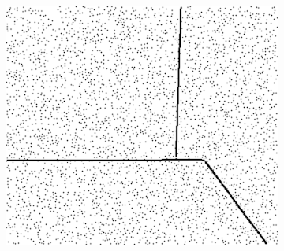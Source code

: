 \documentclass[preprint,10pt,5p,times,twocolumn]{elsarticle}
\begin{document}
\begin{figure}[t]
\begin{subfigure}[t]{0.32\linewidth}
\includegraphics[width=\linewidth]{mask_hybrid.png}
\end{subfigure}


\end{figure}
\end{document}
